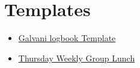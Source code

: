 \section{Templates}
\begin{itemize}
    \item \href{https://docs.google.com/document/d/1pW-zTeiSJdutUG7ir9rBoyD5eRubBpaRs16GNvNYou4/edit}{Galvani logbook Template}
    \item \href{https://docs.google.com/document/d/1yougMXQcd1M_uPpjK7gK8gJw0-Tz47TKAVfftTt90z4/edit}{Thursday Weekly Group Lunch}
   
\end{itemize}